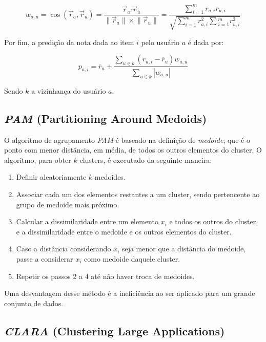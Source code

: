 \documentclass[12pt,a4paper,header]{abnt}
\begin{document}
\begin{equation}
w_{a, u} = \cos({\vec{r}_a, \vec{r}_u}) = \frac{\vec{r}_a \boldsymbol{\cdot} \vec{r}_u}{\lVert \vec{r}_a\rVert \times \lVert \vec{r}_u\rVert} = \frac{\sum_{i=1}^{m}{r_{a, i} r_{u, i}}}{\sqrt{\sum_{i=1}^{m}{r^2_{a, i}} \sum{_{i=1}^{m}{r^2_{u, i}}}}}
\end{equation}

Por fim, a predição da nota dada ao item $i$ pelo usuário $a$ é dada por:

\begin{equation}
p_{a, i} = \overline{r}_a + \frac{\sum_{u \in k}{(r_{u, i} - \overline{r}_u) w_{a, u}}}{\sum_{u \in k}{\left|w_{a, u}\right|}}
\end{equation}

Sendo $k$ a vizinhança do usuário $a$.

\subsection{\textit{PAM} (Partitioning Around Medoids)}

O algoritmo de agrupamento \textit{PAM} é baseado na definição de \textit{medoide}, que é o ponto com menor distância, em média, de todos os outros elementos do cluster. O algoritmo, para obter $k$ clusters, é executado da seguinte maneira\cite{do2005agrupamentos}:

\begin{enumerate}

\item{Definir aleatoriamente $k$ medoides.}
\item{Associar cada um dos elementos restantes a um cluster, sendo pertencente ao grupo de medoide mais próximo.}
\item{Calcular a dissimilaridade entre um elemento $x_i$ e todos os outros do cluster, e a dissimilaridade entre o medoide e os outros elementos do cluster.}
\item{Caso a distância considerando $x_i$ seja menor que a distância do medoide, passe a considerar $x_i$ como medoide daquele cluster.}
\item{Repetir os passos 2 a 4 até não haver troca de medoides.}

\end{enumerate}

Uma desvantagem desse método é a ineficiência ao ser aplicado para um grande conjunto de dados\cite{park2009simple}.

\subsection{\textit{CLARA} (Clustering Large Applications)}
\end{document}
